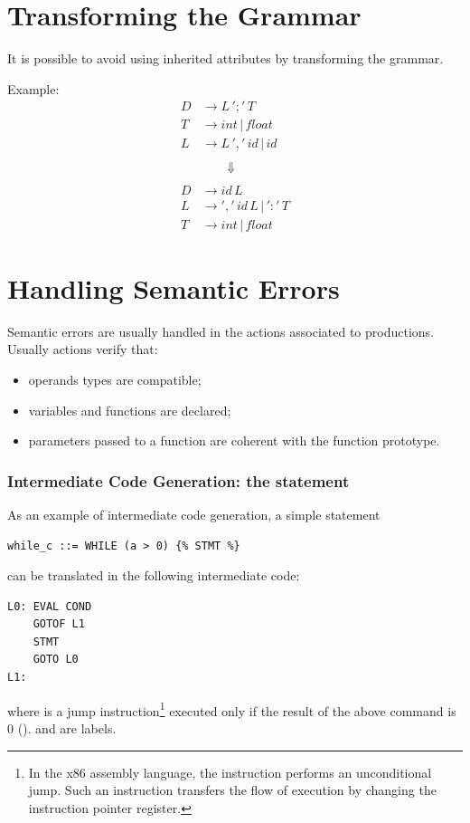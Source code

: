 \section{Transforming the Grammar}
It is possible to avoid using inherited attributes by transforming the grammar.

Example:
\begin{align*}
    D &\to L \, ';' \, T\\
    T &\to int \, | \, float\\
    L &\to L \, ',' \, id \, | \, id\\
    \\
    & \qquad \Downarrow\\
    \\
    D &\to id \, L\\
    L &\to ',' \, id \, L \, | \, ':' \, T\\
    T &\to int \, | \, float
\end{align*}

\section{Handling Semantic Errors}
Semantic errors are usually handled in the actions associated to productions.
Usually actions verify that:
\begin{itemize}
    \item
    operands types are compatible;
    \item
    variables and functions are declared;
    \item
    parameters passed to a function are coherent with the function prototype.
\end{itemize}

\subsubsection{Intermediate Code Generation: the  statement}
As an example of intermediate code generation, a simple  statement
\begin{lstlisting}
while_c ::= WHILE (a > 0) {% STMT %}
\end{lstlisting}
can be translated in the following intermediate code:
\begin{lstlisting}
L0: EVAL COND
    GOTOF L1
    STMT
    GOTO L0
L1:
\end{lstlisting}
where  is a jump instruction\footnote{In the x86 assembly language, the  instruction performs an unconditional jump. Such an instruction transfers the flow of execution by changing the instruction pointer register.} executed only if the result of the above  command is 0 ().
 and  are labels.

